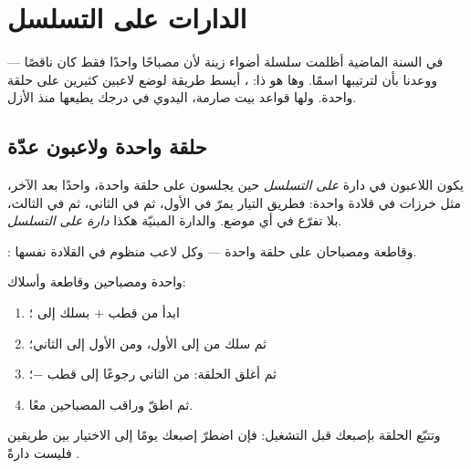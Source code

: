 \chapter{الدارات على التسلسل}\label{ch:g4:series-circuits}

في السنة الماضية أظلمت سلسلة أضواء زينة لأن مصباحًا واحدًا فقط
كان ناقصًا --- ووعدنا بأن لترتيبها اسمًا. وها هو ذا: ، أبسط طريقة لوضع لاعبين كثيرين على حلقة واحدة. ولها قواعد
بيت صارمة،  اليدوي في درجك يطيعها منذ الأزل.

\section{حلقة واحدة ولاعبون عدّة}

\begin{definition}\label{def:g4:series-circuits:series}
يكون اللاعبون في دارة \emph{على التسلسل}
حين يجلسون على حلقة واحدة، واحدًا بعد الآخر، مثل خرزات في قلادة
واحدة: فطريق التيار يمرّ في الأول، ثم في الثاني، ثم في الثالث،
بلا تفرّع في أي موضع. والدارة المبنيّة هكذا \emph{دارة على
التسلسل}.
\end{definition}

\begin{omfigure}

{\small {}:  وقاطعة ومصباحان على حلقة واحدة
--- وكل لاعب منظوم في القلادة نفسها.}
\end{omfigure}

\begin{method}\label{met:g4:series-circuits:build}
 واحدة ومصباحين وقاطعة وأسلاك:
\begin{enumerate}
  \item ابدأ من قطب  $+$ بسلك إلى ؛
  \item ثم سلك من  إلى  الأول، ومن  الأول
        إلى الثاني؛
  \item ثم أغلق الحلقة: من  الثاني رجوعًا إلى قطب
         $-$؛
  \item ثم اطقّ  وراقب المصباحين معًا.
\end{enumerate}
وتتبّع الحلقة بإصبعك قبل التشغيل: فإن اضطرّ إصبعك يومًا إلى
الاختيار بين طريقين فليست دارةً .
\end{method}

